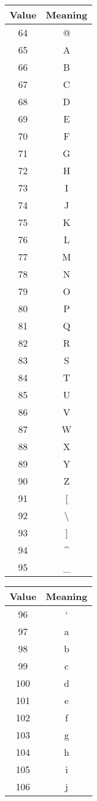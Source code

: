 {\begin{tabular}{c c}
  \hline
  Value & Meaning \\
  \hline
   64 & @ \\
   65 & A \\
   66 & B \\
   67 & C \\
   68 & D \\
   69 & E \\
   70 & F \\
   71 & G \\
   72 & H \\
   73 & I \\
   74 & J \\
   75 & K \\
   76 & L \\
   77 & M \\
   78 & N \\
   79 & O \\
   80 & P \\
   81 & Q \\
   82 & R \\
   83 & S \\
   84 & T \\
   85 & U \\
   86 & V \\
   87 & W \\
   88 & X \\
   89 & Y \\
   90 & Z \\
   91 & [ \\
   92 & \textbackslash \\
   93 & ] \\
   94 & \textasciicircum \\
   95 & \_ \\
\end{tabular}
\begin{tabular}{c c}
  \hline
  Value & Meaning \\
  \hline
   96 & ` \\
   97 & a \\
   98 & b \\
   99 & c \\
  100 & d \\
  101 & e \\
  102 & f \\
  103 & g \\
  104 & h \\
  105 & i \\
  106 & j \\

\end{tabular}}
